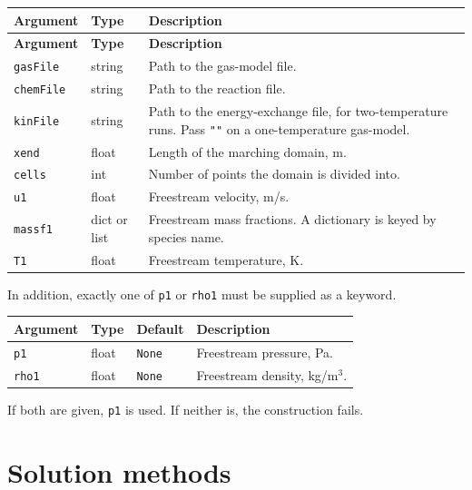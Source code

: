 \documentclass[10pt,a4paper]{article}
\renewcommand{\_}{\origunderscore\penalty4000\relax}
\begin{document}
\begin{longtable}{@{}lL{22mm}L{102mm}@{}}
    \toprule
    \textbf{Argument} & \textbf{Type} & \textbf{Description} \\
    \midrule
    \endfirsthead
    \toprule
    \textbf{Argument} & \textbf{Type} & \textbf{Description} \\
    \midrule
    \endhead
    \bottomrule
    \endfoot
    \endlastfoot
    \texttt{gasFile} & string & Path to the gas-model file. \\
    \addlinespace
    \texttt{chemFile} & string & Path to the reaction file. \\
    \addlinespace
    \texttt{kinFile} & string & Path to the energy-exchange file, for two-temperature runs. Pass \texttt{""} on a one-temperature gas-model. \\
    \addlinespace
    \texttt{x\_end} & float & Length of the marching domain, m. \\
    \addlinespace
    \texttt{cells} & int & Number of points the domain is divided into. \\
    \addlinespace
    \texttt{u1} & float & Freestream velocity, m/s. \\
    \addlinespace
    \texttt{massf1} & dict or list & Freestream mass fractions. A dictionary is keyed by species name. \\
    \addlinespace
    \texttt{T1} & float & Freestream temperature, K. \\
    \bottomrule
\end{longtable}

In addition, exactly one of \texttt{p1} or \texttt{rho1} must be supplied as a keyword.

\begin{center}
	\begin{tabular}{@{}lllL{88mm}@{}}
	\toprule
	\textbf{Argument} & \textbf{Type} & \textbf{Default} & \textbf{Description} \\
	\midrule
	\texttt{p1} & float & \texttt{None} & Freestream pressure, Pa. \\
	\addlinespace
	\texttt{rho1} & float & \texttt{None} & Freestream density, kg/m$^3$. \\
	\bottomrule
	\end{tabular}
\end{center}

If both are given, \texttt{p1} is used. If neither is, the construction fails.

\section*{Solution methods}
\end{document}
